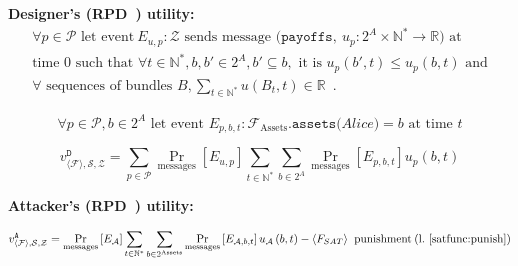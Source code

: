 \noindent \textbf{Designer's (RPD~\cite{rationalprotocol}) utility:}
\begin{gather*}
  \forall p \in \mathcal{P} \text{ let event} \: E_{u, p}: \mathcal{Z} \text{ sends
  message } \mathtt{(payoffs,} \: u_p:2^A \times \mathbb{N}^* \rightarrow \mathbb{R}
  \mathtt{)} \text{ at} \\
  \text{time 0 such that } \forall t \in \mathbb{N}^*, b, b' \in 2^A, b' \subseteq b,
  \text{ it is } u_p\left(b', t\right) \leq u_p\left(b, t\right) \text{ and} \\
  \forall \text{ sequences of bundles } B, \sum\limits_{t \in \mathbb{N}^*}u\left(B_t,
  t\right) \in \mathbb{R}\enspace.
\end{gather*}

\begin{equation*}
  \forall p \in \mathcal{P}, b \in 2^A \text{ let event } E_{p, b, t}:
  \mathcal{F}_{\mathrm{Assets}}.\mathtt{assets(}Alice\mathtt{)} = b \text{ at time } t
\end{equation*}

\begin{equation*}
  v^{\mathtt{D}}_{\langle \mathcal{F} \rangle, \mathcal{S}, \mathcal{Z}} = \sum\limits_{p
  \in \mathcal{P}} \Pr\limits_{\mathrm{messages}}\left[E_{u, p}\right] \sum\limits_{t \in
  \mathbb{N}^*} \sum\limits_{b \in 2^A} \Pr\limits_{\mathrm{messages}}\left[E_{p, b,
  t}\right] u_p\left(b, t\right)
\end{equation*}

\noindent \textbf{Attacker's (RPD~\cite{rationalprotocol}) utility:}

\begin{equation*}
  v^{\mathtt{A}}_{\langle \mathcal{F} \rangle, \mathcal{S}, \mathcal{Z}} =
  \Pr\limits_{\mathrm{messages}}\left[E_\mathcal{A}\right] \sum\limits_{t \in
  \mathbb{N}^*} \sum\limits_{b \in 2^{\mathrm{Assets}}}
  \Pr\limits_{\mathrm{messages}}\left[E_{\mathcal{A}, b, t}\right] u_{\mathcal{A}}\left(b,
  t\right) - \langle F_{SAT} \rangle \: \mathrm{~punishment \: (l.~\ref{satfunc:punish})}
\end{equation*}
